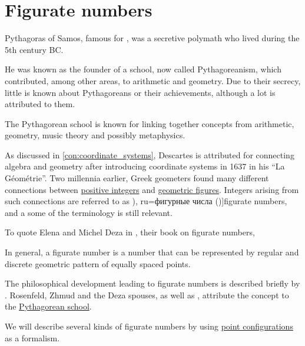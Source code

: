 \section{Figurate numbers}\label{sec:figurate_numbers}

\begin{remark}\label{rem:pythagoreanism}
  Pythagoras of Samos, famous for , was a secretive polymath who lived during the 5th century BC.

  He was known as the founder of a school, now called Pythagoreanism, which contributed, among other areas, to arithmetic and geometry. Due to their secrecy, little is known about Pythagoreans or their achievements, although a lot is attributed to them.

  The Pythagorean school is known for linking together concepts from arithmetic, geometry, music theory and possibly metaphysics.
\end{remark}

\begin{concept}\label{con:figurate_number}
  As discussed in \cref{con:coordinate_systems}, Descartes is attributed for connecting algebra and geometry after introducing coordinate systems in 1637 in his \enquote{La Géométrie}. Two millennia earlier, Greek geometers found many different connections between \hyperref[def:integers]{positive integers} and \hyperref[con:geometric_shape]{geometric figures}. Integers arising from such connections are referred to as \term[en=figurate number (\cite[xv]{Deza2012FigurateNumbers}), ru=фигурные числа (\cite[14]{Розенфельд1963ОсновныеПонятиеГеометрии})]{figurate numbers}, and a some of the terminology is still relevant.

  To quote Elena and Michel Deza in \cite[xv]{Deza2012FigurateNumbers}, their book on figurate numbers,
  \begin{displayquote}
    In general, a figurate number is a number that can be represented by regular and discrete geometric pattern of equally spaced points.
  \end{displayquote}

  The philosophical development leading to figurate numbers is described briefly by \textcite{Розенфельд1963ОсновныеПонятиеГеометрии}. Rosenfeld, Zhmud and the Deza spouses, as well as \textcite[1; 2]{Apostol1976AnalyticNumberTheory}, attribute the concept to the \hyperref[rem:pythagoreanism]{Pythagorean school}.

  We will describe several kinds of figurate numbers by using \hyperref[def:point_configuration]{point configurations} as a formalism.
\end{concept}

